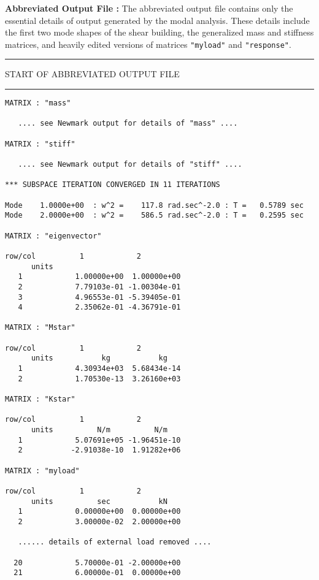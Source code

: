 \vspace{0.15 in}\noindent
{\bf Abbreviated Output File :}
The abbreviated output file contains only the essential details
of output generated by the modal analysis.
These details include the first two mode shapes of the shear building,
the generalized mass and stiffness matrices,
and heavily edited versions of matrices {\tt "myload"} and {\tt "response"}.

\vspace{0.20 truein}
\begin{footnotesize}
\noindent
{\rule{1.7 in}{0.035 in} START OF ABBREVIATED OUTPUT FILE \rule{1.7 in}{0.035 in} }
\begin{verbatim}
MATRIX : "mass"

   .... see Newmark output for details of "mass" ....

MATRIX : "stiff"

   .... see Newmark output for details of "stiff" ....

*** SUBSPACE ITERATION CONVERGED IN 11 ITERATIONS 

Mode    1.0000e+00  : w^2 =    117.8 rad.sec^-2.0 : T =   0.5789 sec
Mode    2.0000e+00  : w^2 =    586.5 rad.sec^-2.0 : T =   0.2595 sec

MATRIX : "eigenvector"

row/col          1            2          
      units                       
   1            1.00000e+00  1.00000e+00
   2            7.79103e-01 -1.00304e-01
   3            4.96553e-01 -5.39405e-01
   4            2.35062e-01 -4.36791e-01

MATRIX : "Mstar"

row/col          1            2          
      units           kg           kg   
   1            4.30934e+03  5.68434e-14
   2            1.70530e-13  3.26160e+03

MATRIX : "Kstar"

row/col          1            2          
      units          N/m          N/m   
   1            5.07691e+05 -1.96451e-10
   2           -2.91038e-10  1.91282e+06

MATRIX : "myload"

row/col          1            2          
      units          sec           kN   
   1            0.00000e+00  0.00000e+00
   2            3.00000e-02  2.00000e+00

   ...... details of external load removed ....

  20            5.70000e-01 -2.00000e+00
  21            6.00000e-01  0.00000e+00


\end{verbatim}
\end{footnotesize}
